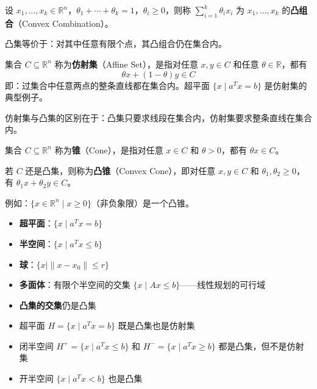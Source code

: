 \begin{definition}[凸组合]
设 $x_1, \ldots, x_k \in \mathbb{R}^n$，$\theta_1 + \cdots + \theta_k = 1$，$\theta_i \geq 0$，则称 $\sum_{i=1}^k \theta_i x_i$ 为 $x_1, \ldots, x_k$ 的\textbf{凸组合}（Convex Combination）。

凸集等价于：对其中任意有限个点，其凸组合仍在集合内。
\end{definition}

\begin{definition}[仿射集]
集合 $C \subseteq \mathbb{R}^n$ 称为\textbf{仿射集}（Affine Set），是指对任意 $x, y \in C$ 和任意 $\theta \in \mathbb{R}$，都有
\[
\theta x + (1-\theta) y \in C
\]
即：过集合中任意两点的整条直线都在集合内。超平面 $\{x \mid a^T x = b\}$ 是仿射集的典型例子。

仿射集与凸集的区别在于：凸集只要求线段在集合内，仿射集要求整条直线在集合内。
\end{definition}

\begin{definition}[锥与凸锥]
集合 $C \subseteq \mathbb{R}^n$ 称为\textbf{锥}（Cone），是指对任意 $x \in C$ 和 $\theta > 0$，都有 $\theta x \in C$。

若 $C$ 还是凸集，则称为\textbf{凸锥}（Convex Cone），即对任意 $x, y \in C$ 和 $\theta_1, \theta_2 \geq 0$，有 $\theta_1 x + \theta_2 y \in C$。

例如：$\{x \in \mathbb{R}^n \mid x \geq 0\}$（非负象限）是一个凸锥。
\end{definition}

\begin{conceptbox}[常见凸集]
\begin{itemize}[itemsep=0.3em]
    \item \textbf{超平面}：$\{x \mid a^T x = b\}$
    \item \textbf{半空间}：$\{x \mid a^T x \leq b\}$
    \item \textbf{球}：$\{x \mid \|x - x_0\| \leq r\}$
    \item \textbf{多面体}：有限个半空间的交集 $\{x \mid Ax \leq b\}$——线性规划的可行域
    \item \textbf{凸集的交集}仍是凸集
\end{itemize}
\end{conceptbox}

\begin{property}[超平面与半空间的特征]
\begin{itemize}[itemsep=0.3em]
    \item 超平面 $H = \{x \mid a^T x = b\}$ 既是凸集也是仿射集
    \item 闭半空间 $H^+ = \{x \mid a^T x \leq b\}$ 和 $H^- = \{x \mid a^T x \geq b\}$ 都是凸集，但不是仿射集
    \item 开半空间 $\{x \mid a^T x < b\}$ 也是凸集
\end{itemize}
\end{property}

